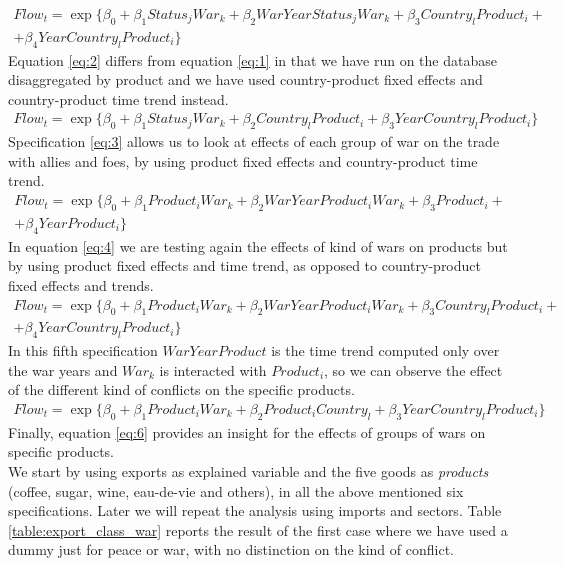 \documentclass[12pt,a4paper,notitlepage,english]{article}
\begin{document}
\begin{multline}\label{eq:2}
Flow_{t}=\exp\{\beta_0+\beta_1Status_jWar_k + \beta_2WarYearStatus_jWar_k+\beta_3Country_lProduct_i +\\ +\beta_4YearCountry_lProduct_i\}
\end{multline}
Equation \ref{eq:2} differs from equation \ref{eq:1} in that we have run on the database disaggregated by product and we have used country-product fixed effects and country-product time trend instead.
\begin{multline}\label{eq:3}
Flow_{t}=\exp\{\beta_0+\beta_1Status_jWar_k + \beta_2Country_lProduct_i+\beta_3YearCountry_lProduct_i\}
\end{multline}
Specification \ref{eq:3} allows us to look at effects of each group of war on the trade with allies and foes, by using product fixed effects and country-product time trend.
\begin{multline}\label{eq:4}
Flow_{t}=\exp\{\beta_0+\beta_1Product_iWar_k + \beta_2WarYearProduct_iWar_k+\beta_3Product_i +\\ +\beta_4YearProduct_i\}
\end{multline}
In equation \ref{eq:4} we are testing again the effects of kind of wars on products but by using product fixed effects and time trend, as opposed to country-product fixed effects and trends.
\begin{multline}\label{eq:5}
Flow_{t}=\exp\{\beta_0+\beta_1Product_iWar_k + \beta_2WarYearProduct_iWar_k+\beta_3Country_lProduct_i +\\ +\beta_4YearCountry_lProduct_i\}
\end{multline}
In this fifth specification $WarYearProduct$ is the time trend computed only over the war years and $War_k$ is interacted with $Product_i$, so we can observe the effect of the different kind of conflicts on the specific products.
\begin{multline}\label{eq:6}
Flow_{t}=\exp\{\beta_0+\beta_1Product_iWar_k + \beta_2Product_iCountry_l+\beta_3YearCountry_lProduct_i\}
\end{multline}
Finally, equation \ref{eq:6} provides an insight for the effects of groups of wars on specific products. \\
We start by using exports as explained variable and the five goods as \textit{products} (coffee, sugar, wine, eau-de-vie and others), in all the above mentioned six specifications.
Later we will repeat the analysis using imports and sectors.
Table \ref{table:export_class_war} reports the result of the first case where we have used a dummy just for peace or war, with no distinction on the kind of conflict.
\end{document}
